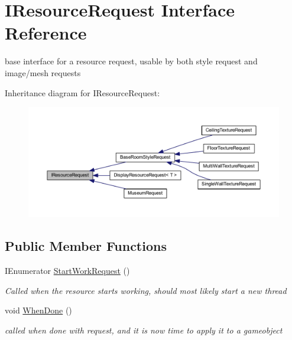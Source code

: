 \hypertarget{interface_i_resource_request}{}\section{I\+Resource\+Request Interface Reference}
\label{interface_i_resource_request}


base interface for a resource request, usable by both style request and image/mesh requests  




Inheritance diagram for I\+Resource\+Request\+:
\nopagebreak
\begin{figure}[H]
\begin{center}
\leavevmode
\includegraphics[width=350pt]{interface_i_resource_request__inherit__graph}
\end{center}
\end{figure}
\subsection*{Public Member Functions}
\begin{DoxyCompactItemize}
\item 
I\+Enumerator \mbox{\hyperlink{interface_i_resource_request_a5b40a09cb820283600ac9e3f846936f9}{Start\+Work\+Request}} ()
\begin{DoxyCompactList}\small\item\em Called when the resource starts working, should most likely start a new thread \end{DoxyCompactList}\item 
void \mbox{\hyperlink{interface_i_resource_request_a056e427fa6233602456ccb2d4c405aa0}{When\+Done}} ()
\begin{DoxyCompactList}\small\item\em called when done with request, and it is now time to apply it to a gameobject \end{DoxyCompactList}\end{DoxyCompactItemize}
